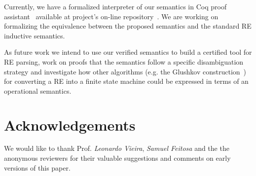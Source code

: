 \documentclass[sigplan]{acmart}
\theoremstyle{definition}
\begin{document}
Currently, we have a formalized interpreter of our semantics in Coq proof assistant~\cite{Bertot2010} available at project's
on-line repository~\cite{regexvm-rep}. We are working on formalizing the equivalence between the proposed semantics and
the standard RE inductive semantics.

As future work we intend to use our verified semantics to build a certified tool for RE
parsing, work on proofs that the semantics follow a specific disambiguation strategy and investigate how other algorithms
(e.g. the Glushkov construction~\cite{Gluskov1961}) for converting a RE into a finite state machine could be expressed in
terms of an operational semantics.

\vspace{-2.0ex}

\section*{Acknowledgements}

We would like to thank Prof. \emph{Leonardo Vieira}, \emph{Samuel Feitosa} and the the anonymous reviewers for their valuable
suggestions and comments on early versions of this paper.

\vspace{-2.0ex}




\end{document}
